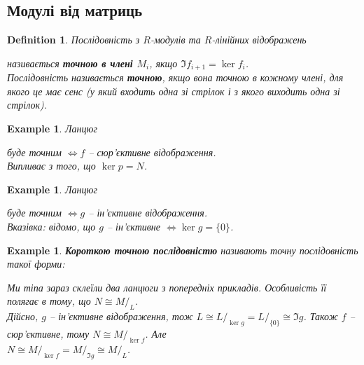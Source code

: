 \documentclass[a4paper, 10pt]{article}
\theoremstyle{theoremdd}
\theoremstyle{theoremdd}
\newtheorem{definition}[theorem]{Definition}
\theoremstyle{theoremdd}
\theoremstyle{theoremdd}
\theoremstyle{theoremdd}
\newtheorem{example}[theorem]{Example}
\theoremstyle{theoremdd}
\theoremstyle{theoremdd}
\theoremstyle{theoremdd}
\theoremstyle{theoremdd}
\theoremstyle{theoremdd}
\theoremstyle{theoremdd}
\theoremstyle{theoremdd}
\theoremstyle{theoremdd}
\theoremstyle{theoremdd}
\theoremstyle{theoremdd}
\begin{document}
\subsection{Модулі від матриць}
\begin{definition}
Послідовність з $R$-модулів та $R$-лінійних відображень
\begin{figure}[H]
\centering
{}
\end{figure}
називається \textbf{точною в члені $M_i$}, якщо $\Im f_{i+1} = \ker f_i$.\\
Послідовність називається \textbf{точною}, якщо вона  точною в кожному члені, для якого це має сенс (у який входить одна зі стрілок і з якого виходить одна зі стрілок).
\end{definition}

\begin{example}
\label{chain_for_surjective_map}
Ланцюг  буде точним $\iff f$ -- сюр'єктивне відображення.\\
\textit{Випливає з того, що $\ker p = N$.}
\end{example}

\begin{example}
\label{chain_for_injective_map}
Ланцюг  буде точним $\iff g$ -- ін'єктивне відображення.\\
\textit{Вказівка: відомо, що $g$ -- ін'єктивне $\iff \ker g = \{0\}$.}
\end{example}

\begin{example}
\textbf{Короткою точною послідовністю} називають точну послідовність такої форми:
\begin{figure}[H]
\centering
{}
\end{figure}
Ми тіпа зараз склеїли два ланцюги з попередніх прикладів. Особливість її полягає в тому, що $N \cong M/_L$.\\
Дійсно, $g$ -- ін'єктивне відображення, тож $L \cong L/_{\ker g} = L/_{\{0\}} \cong \Im g$. Також $f$ -- сюр'єктивне, тому $N \cong M/_{\ker f}$. Але\\
$N \cong M/_{\ker f} = M/_{\Im g} \cong M/_L$.
\end{example}
\end{document}

